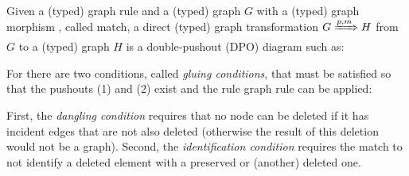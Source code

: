 \begin{definition} Given a (typed) graph rule \graphrule{} and a (typed) graph $G$ with a (typed) graph morphism \match, called match, a direct (typed) graph transformation $G \xRightarrow{p,m} H$ from $G$ to a (typed) graph $H$ is a double-pushout (DPO) diagram such as:


  For  there are two conditions, called \emph{gluing conditions}, that must be satisfied so that the pushouts (1) and (2) exist and the rule graph rule can be applied:
  
  First, the \emph{dangling condition} requires that no node can be deleted if it has incident edges that are not also deleted (otherwise the result of this deletion would not be a graph).  Second, the \emph{identification condition} requires the match to not identify a deleted element with a preserved or (another) deleted one.
\end{definition}

